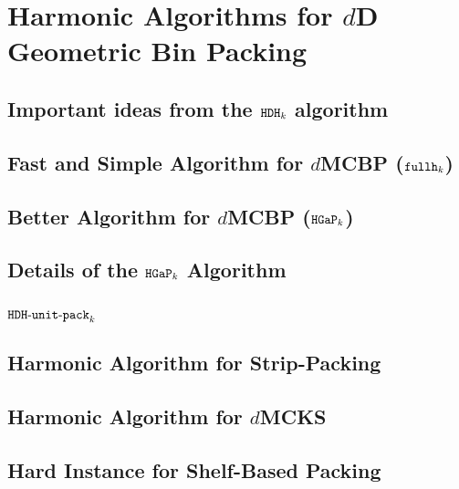 \chapter{Harmonic Algorithms for \texorpdfstring{$d$}{d}D Geometric Bin Packing}
\label{chap:hdhk}



\section{Important ideas from the \texorpdfstring{$\operatorname{\mathtt{HDH}}_{k}$}{HDH} algorithm}
\label{sec:hdhk-prelims}
\label{sec:hdhk-prelims:hdhkunit}

\section{Fast and Simple Algorithm for \texorpdfstring{$d$}{d}MCBP
(\texorpdfstring{$\operatorname{\mathtt{fullh}}_k$}{fullh\_k})}
\label{sec:fhk}

\section{Better Algorithm for \texorpdfstring{$d$}{d}MCBP
(\texorpdfstring{$\operatorname{\mathtt{HGaP}}_k$}{HGaP\_k})}
\label{sec:hgap}

\section{Details of the \texorpdfstring{$\operatorname{\mathtt{HGaP}}_k$}{HGaP} Algorithm}
\label{sec:hgap-extra}

\section{\texorpdfstring{$\operatorname{\mathtt{HDH-unit-pack}}_k$}{HDH-unit-pack}}
\label{sec:hdhkunit}

\section{Harmonic Algorithm for Strip-Packing}
\label{sec:hdhk-sp}

\section{Harmonic Algorithm for \texorpdfstring{$d$}{d}MCKS}
\label{sec:hdhks}

\begin{optional}
\section{Hard Instance for Shelf-Based Packing}
\label{sec:hard-example}
\end{optional}
